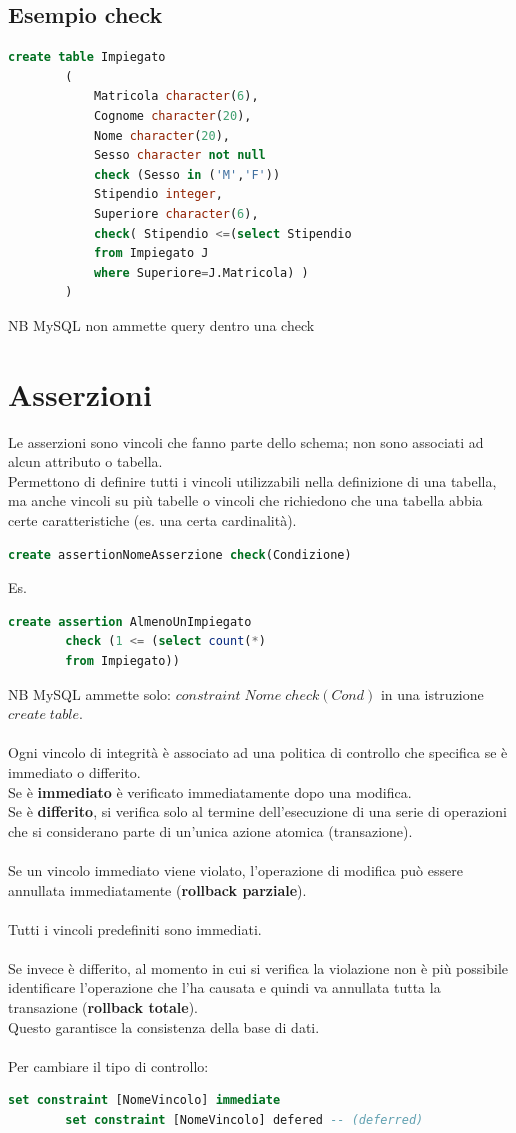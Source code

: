 \documentclass{article}
\begin{document}
	\subsection{Esempio check}
	\begin{lstlisting}[language=SQL]
		create table Impiegato
		(
			Matricola character(6),
			Cognome character(20),
			Nome character(20),
			Sesso character not null
			check (Sesso in ('M','F'))
			Stipendio integer,
			Superiore character(6),
			check( Stipendio <=(select Stipendio
			from Impiegato J
			where Superiore=J.Matricola) )
		)
	\end{lstlisting}
	NB MySQL non ammette query dentro una check
	\section{Asserzioni}
	Le asserzioni sono vincoli che fanno parte dello schema; non sono associati ad alcun attributo o tabella.\\
	Permettono di definire tutti i vincoli utilizzabili nella definizione di una tabella, ma anche vincoli su più tabelle o vincoli che richiedono che una tabella abbia certe caratteristiche (es. una certa cardinalità).
	\begin{lstlisting}[language=SQL]
		create assertionNomeAsserzione check(Condizione)
	\end{lstlisting}
	Es.
	\begin{lstlisting}[language=SQL]
		create assertion AlmenoUnImpiegato
		check (1 <= (select count(*)
		from Impiegato))
	\end{lstlisting}
	NB MySQL ammette solo: $constraint \; Nome \; check(Cond)$ in una istruzione $create \; table$.\\\\
	Ogni vincolo di integrità è associato ad una politica di controllo che specifica se è immediato o differito.\\
	Se è \textbf{immediato} è verificato immediatamente dopo una modifica.\\
	Se è \textbf{differito}, si verifica solo al termine dell'esecuzione di una serie di operazioni che si considerano parte di un'unica azione atomica (transazione).\\\\
	Se un vincolo immediato viene violato, l'operazione di modifica può essere annullata immediatamente (\textbf{rollback parziale}). \\\\
	Tutti i vincoli predefiniti sono immediati.\\\\
	Se invece è differito, al momento in cui si verifica la violazione non è più possibile identificare l'operazione che l'ha causata e quindi va annullata tutta la transazione (\textbf{rollback totale}).\\
	Questo garantisce la consistenza della base di dati.\\\\
	Per cambiare il tipo di controllo:
	\begin{lstlisting}[language=SQL]
		set constraint [NomeVincolo] immediate
		set constraint [NomeVincolo] defered -- (deferred)
	\end{lstlisting}
\end{document}
